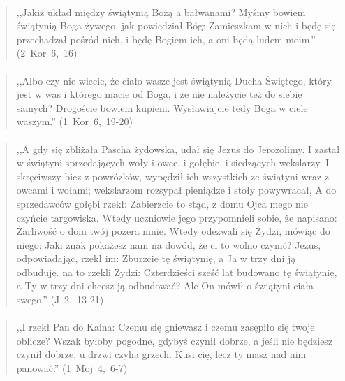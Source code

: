 \documentclass[10pt,a4paper,oneside]{article}
\begin{document}
\paragraph{}
\begin{quote}
,,Jakiż układ między świątynią Bożą a bałwanami? Myśmy bowiem świątynią Boga żywego, jak powiedział Bóg: Zamieszkam w nich i będę się przechadzał pośród nich, i będę Bogiem ich, a oni będą ludem moim.'' \mbox{(2 Kor 6, 16)}
\end{quote}
\paragraph{}
\begin{quote}
,,Albo czy nie wiecie, że ciało wasze jest świątynią Ducha Świętego, który jest w was i którego macie od Boga, i że nie należycie też do siebie samych? Drogoście bowiem kupieni. Wysławiajcie tedy Boga w ciele waszym.'' \mbox{(1 Kor 6, 19-20)}
\end{quote}
\paragraph{}
\begin{quote}
,,A gdy się zbliżała Pascha żydowska, udał się Jezus do Jerozolimy. I zastał w świątyni sprzedających woły i owce, i gołębie, i siedzących wekslarzy. I skręciwszy bicz z powrózków, wypędził ich wszystkich ze świątyni wraz z owcami i wołami; wekslarzom rozsypał pieniądze i stoły powywracał, A do sprzedawców gołębi rzekł: Zabierzcie to stąd, z domu Ojca mego nie czyńcie targowiska. Wtedy uczniowie jego przypomnieli sobie, że napisano: Żarliwość o dom twój pożera mnie. Wtedy odezwali się Żydzi, mówiąc do niego: Jaki znak pokażesz nam na dowód, że ci to wolno czynić? Jezus, odpowiadając, rzekł im: Zburzcie tę świątynię, a Ja w trzy dni ją odbuduję. na to rzekli Żydzi: Czterdzieści sześć lat budowano tę świątynię, a Ty w trzy dni chcesz ją odbudować? Ale On mówił o świątyni ciała swego.'' \mbox{(J 2, 13-21)}
\end{quote}
\paragraph{}
\begin{quote}
,,I rzekł Pan do Kaina: Czemu się gniewasz i czemu zasępiło się twoje oblicze? Wszak byłoby pogodne, gdybyś czynił dobrze, a jeśli nie będziesz czynił dobrze, u drzwi czyha grzech. Kusi cię, lecz ty masz nad nim panować.'' \mbox{(1 Moj 4, 6-7)}
\end{quote}
\end{document}
